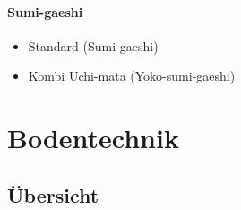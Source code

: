 \documentclass[justified, a4paper, notitlepage, captions=tableheading, nobib]{tufte-handout}
\begin{document}
\paragraph{Sumi-gaeshi }
\label{sec:org3504582}
\begin{itemize}
\item Standard (Sumi-gaeshi)
\item Kombi Uchi-mata (Yoko-sumi-gaeshi)
\end{itemize}

\newpage
\section{Bodentechnik }
\label{sec:org3d8106f}
\subsection{Übersicht}
\label{sec:org5aec755}
\end{document}
